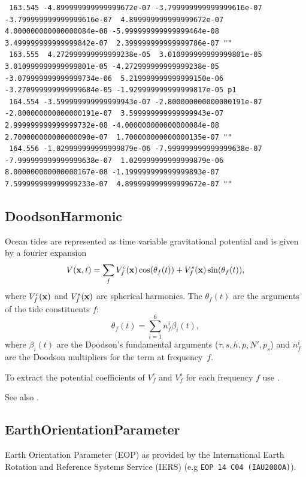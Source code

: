 \begin{verbatim}
 163.545 -4.899999999999999672e-07 -3.799999999999999616e-07 -3.799999999999999616e-07  4.899999999999999672e-07  4.000000000000000084e-08 -5.999999999999999464e-08  3.499999999999999842e-07  2.399999999999999786e-07 ""
 163.555  4.272999999999999238e-05  3.010999999999999801e-05  3.010999999999999801e-05 -4.272999999999999238e-05 -3.079999999999999734e-06  5.219999999999999150e-06 -3.270999999999999684e-05 -1.929999999999999817e-05 p1
 164.554 -3.599999999999999943e-07 -2.800000000000000191e-07 -2.800000000000000191e-07  3.599999999999999943e-07  2.999999999999999732e-08 -4.000000000000000084e-08  2.700000000000000090e-07  1.700000000000000135e-07 ""
 164.556 -1.029999999999999879e-06 -7.999999999999999638e-07 -7.999999999999999638e-07  1.029999999999999879e-06  8.000000000000000167e-08 -1.199999999999999893e-07  7.599999999999999233e-07  4.899999999999999672e-07 ""
\end{verbatim}


\subsection{DoodsonHarmonic}\label{general.fileFormat:doodsonHarmonic}
Ocean tides are represented as time variable gravitational potential
and is given by a fourier expansion
\begin{equation}
V(\mathbf{x},t) = \sum_{f} V_f^c(\mathbf{x})\cos(\theta_f(t)) + V_f^s(\mathbf{x})\sin(\theta_f(t)),
\end{equation}
where $V_f^c(\mathbf{x})$ and $V_f^s(\mathbf{x})$ are spherical harmonics.
The $\theta_f(t)$ are the arguments of the tide constituents $f$:
\begin{equation}
\theta_f(t) = \sum_{i=1}^6 n_f^i\beta_i(t),
\end{equation}
where $\beta_i(t)$ are the Doodson's fundamental arguments ($\tau,s,h,p,N',p_s$) and $n_f^i$
are the Doodson multipliers for the term at frequency~$f$.

To extract the potential coefficients of $V_f^c$ and $V_f^s$
for each frequency $f$ use .

See also .


\subsection{EarthOrientationParameter}\label{general.fileFormat:earthOrientationParameter}
Earth Orientation Parameter (EOP) as provided by the International Earth Rotation and Reference Systems Service (IERS) (e.g \verb|EOP 14 C04 (IAU2000A)|).

